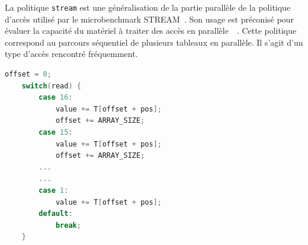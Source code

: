 La politique \texttt{stream} est une généralisation de la partie parallèle de la politique d'accès utilisé par le microbenchmark \textsc{STREAM}~\cite{STREAM}.
Son usage est préconisé pour évaluer la capacité du matériel à traiter des accès en parallèle~\cite{black2013bandwidth}~\cite{valsan2016taming}.
Cette politique correspond au parcours séquentiel de plusieurs tableaux en parallèle.
Il s'agit d'un type d'accès rencontré fréquemment.

\begin{lstlisting}[language=c]
	offset = 0;
	switch(read) {
		case 16:
			value += T[offset + pos];
			offset += ARRAY_SIZE;
		case 15:
			value += T[offset + pos];
			offset += ARRAY_SIZE;
		...
		...
		case 1:
			value += T[offset + pos];
		default:
			break;
	} 

\end{lstlisting}



% 


